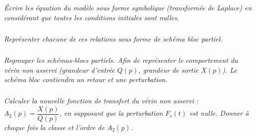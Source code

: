 \documentclass[11pt,oneside]{article}
\begin{document}
\subparagraph{}
\textit{Écrire les équation du modèle sous forme symbolique (transformée de Laplace) en considérant que toutes les conditions initiales sont nulles.}

\subparagraph{}
\textit{Représenter chacune de ces relations sous forme de schéma bloc partiel.}

\subparagraph{}
\textit{Regrouper les schémas-blocs partiels. Afin de représenter le comportement du vérin non asservi (grandeur d'entrée $Q(p)$, grandeur de sortie $X(p)$). Le schéma bloc contiendra un retour et une perturbation.}

\subparagraph{}
\textit{Calculer la nouvelle fonction de transfert du vérin non asservi : $A_2(p)=\dfrac{X(p)}{Q(p)}$, en supposant que la perturbation $F_r(t)$ est nulle. Donner à chaque fois la classe et l'ordre de $A_2(p)$.}
\end{document}
